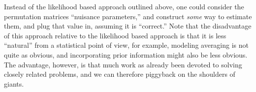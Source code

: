 Instead of the likelihood based approach outlined above, one could consider the permutation matrices ``nuisance parameters,'' and construct \emph{some} way to estimate them, and plug that value in, assuming it is ``correct.'' Note that the disadvantage of this approach relative to the likelihood based approach is that it is less ``natural'' from a statistical point of view, for example, modeling averaging is not quite as obvious, and incorporating prior information might also be less obvious.  The advantage, however, is that much work as already been devoted to solving closely related problems,  and we can therefore piggyback on the shoulders of giants.  %

